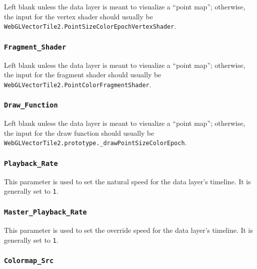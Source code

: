 \documentclass[
  12pt,
]{krantz}
\begin{document}
Left blank unless the data layer is meant to visualize a ``point map''; otherwise, the input for the vertex shader should usually be \texttt{WebGLVectorTile2.PointSizeColorEpochVertexShader}.

\hypertarget{fragment_shader}{%
\subsubsection*{\texorpdfstring{\texttt{Fragment\_Shader}}{Fragment\_Shader}}\label{fragment_shader}}


Left blank unless the data layer is meant to visualize a ``point map''; otherwise, the input for the fragment shader should usually be \texttt{WebGLVectorTile2.PointColorFragmentShader}.

\hypertarget{draw_function}{%
\subsubsection*{\texorpdfstring{\texttt{Draw\_Function}}{Draw\_Function}}\label{draw_function}}


Left blank unless the data layer is meant to visualize a ``point map''; otherwise, the input for the draw function should usually be \texttt{WebGLVectorTile2.prototype.\_drawPointSizeColorEpoch}.

\hypertarget{playback_rate}{%
\subsubsection*{\texorpdfstring{\texttt{Playback\_Rate}}{Playback\_Rate}}\label{playback_rate}}


This parameter is used to set the natural speed for the data layer's timeline. It is generally set to \texttt{1}.

\hypertarget{master_playback_rate}{%
\subsubsection*{\texorpdfstring{\texttt{Master\_Playback\_Rate}}{Master\_Playback\_Rate}}\label{master_playback_rate}}


This parameter is used to set the override speed for the data layer's timeline. It is generally set to \texttt{1}.

\hypertarget{colormap_src}{%
\subsubsection*{\texorpdfstring{\texttt{Colormap\_Src}}{Colormap\_Src}}\label{colormap_src}}
\end{document}

